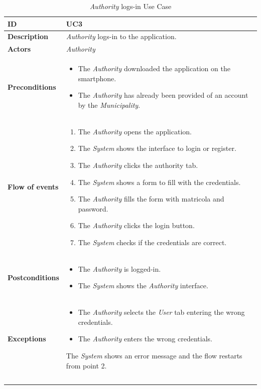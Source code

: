 \documentclass {article}
\begin{document}
	\begin{longtable}{| p{3 cm} | p{10.5 cm} |} 
			\hline
			{\bf ID} & UC3 \\
			\hline
			{\bf Description} & {\it Authority} logs-in to the application. \\
			\hline
			{\bf Actors} & {\it Authority} \\
			\hline
			{\bf Preconditions} & 	
			\begin{itemize}
				\item The {\it Authority} downloaded the application on the smartphone.
				\item The {\it Authority} has already been provided of an account by the {\it Municipality}.
			\end{itemize}
			\\
			\hline
			{\bf Flow of events} &	
			\begin{enumerate}
				\item The {\it Authority} opens the application.
				\item The {\it System} shows the interface to login or register.
				\item The {\it Authority} clicks the authority tab.
				\item The {\it System} shows a form to fill with the credentials.
				\item The {\it Authority} fills the form with matricola and password. 
				\item The {\it Authority} clicks the login button.
				\item The {\it System} checks if the credentials are correct. 
			\end{enumerate}
			\\
			\hline
			{\bf Postconditions} & 
			\begin{itemize}
				\item The {\it Authority} is logged-in.
				\item The {\it System} shows the {\it Authority} interface.
			\end{itemize}
			\\
			\hline
			{\bf Exceptions} & 	
			\begin{itemize}
				\item The {\it Authority} selects the {\it User} tab entering the wrong credentials.
				\item The {\it Authority} enters the wrong credentials.
			\end{itemize}
			The {\it System} shows an error message and the flow restarts from point 2.
			\\ \\
			\hline
			\caption{{\it Authority} logs-in Use Case}
			\end{longtable}
\end{document}
